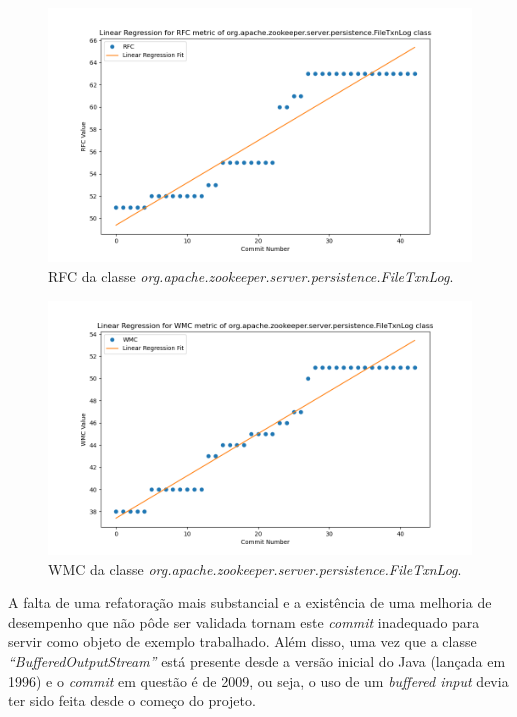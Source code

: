 \begin{figure}[h]
    \centering
    \includegraphics[width=0.8\linewidth]{figuras/343-83cf0a93c37759334fab885c2010fa0b7d953f52/Class-org.apache.zookeeper.server.persistence.FileTxnLog/RFC.png}
    \caption{RFC da classe \textit{org.apache.zookeeper.server.persistence.FileTxnLog}.}
    \label{fig:RFC3xPerformanceClass}
\end{figure}

\begin{figure}[h]
    \centering
    \includegraphics[width=0.8\linewidth]{figuras/343-83cf0a93c37759334fab885c2010fa0b7d953f52/Class-org.apache.zookeeper.server.persistence.FileTxnLog/WMC.png}
    \caption{WMC da classe \textit{org.apache.zookeeper.server.persistence.FileTxnLog}.}
    \label{fig:WMC3xPerformanceClass}
\end{figure}

A falta de uma refatoração mais substancial e a existência de uma melhoria de desempenho que não pôde ser validada tornam este \textit{commit} inadequado para servir como objeto de exemplo trabalhado. Além disso, uma vez que a classe \textit{``BufferedOutputStream''} está presente desde a versão inicial do Java (lançada em 1996) e o \textit{commit} em questão é de 2009, ou seja, o uso de um \textit{buffered input} devia ter sido feita desde o começo do projeto.

